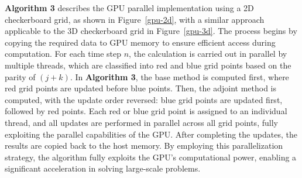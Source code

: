 \documentclass[fleqn,11pt]{elsarticle}
\numberwithin{equation}{section}
\begin{document}

{\bf Algorithm 3} describes the GPU parallel implementation using a 2D checkerboard grid, as shown in Figure~\ref{gpu-2d}, with a similar approach applicable to the 3D checkerboard grid in Figure~\ref{gpu-3d}. The process begins by copying the required data to GPU memory to ensure efficient access during computation. For each time step $n$, the calculation is carried out in parallel by multiple threads, which are classified into red and blue grid points based on the parity of $(j+k)$. In {\bf Algorithm 3}, the base method is computed first, where red grid points are updated before blue points. Then, the adjoint method is computed, with the update order reversed: blue grid points are updated first, followed by red points. Each red or blue grid point is assigned to an individual thread, and all updates are performed in parallel across all grid points, fully exploiting the parallel capabilities of the GPU. After completing the updates, the results are copied back to the host memory. By employing this parallelization strategy, the algorithm fully exploits the GPU’s computational power, enabling a significant acceleration in solving large-scale problems.
\end{document}
